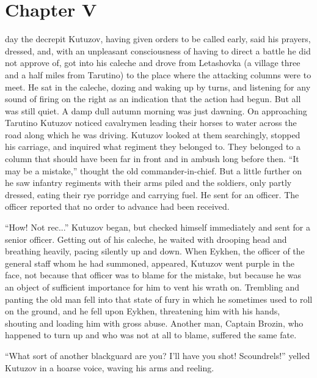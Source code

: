 \chapter*{Chapter V} \ifaudio {}
\fi

 day the decrepit Kutuzov, having given orders to be called
early, said his prayers, dressed, and, with an unpleasant
consciousness of having to direct a battle he did not approve of,
got into his caleche and drove from Letashovka (a village three
and a half miles from Tarutino) to the place where the attacking
columns were to meet. He sat in the caleche, dozing and waking up
by turns, and listening for any sound of firing on the right as
an indication that the action had begun.  But all was still
quiet. A damp dull autumn morning was just dawning. On
approaching Tarutino Kutuzov noticed cavalrymen leading their
horses to water across the road along which he was
driving. Kutuzov looked at them searchingly, stopped his
carriage, and inquired what regiment they belonged to. They
belonged to a column that should have been far in front and in
ambush long before then. ``It may be a mistake,'' thought the old
commander-in-chief. But a little further on he saw infantry
regiments with their arms piled and the soldiers, only partly
dressed, eating their rye porridge and carrying fuel. He sent for
an officer. The officer reported that no order to advance had
been received.

``How! Not rec...'' Kutuzov began, but checked himself
immediately and sent for a senior officer. Getting out of his
caleche, he waited with drooping head and breathing heavily,
pacing silently up and down. When Eykhen, the officer of the
general staff whom he had summoned, appeared, Kutuzov went purple
in the face, not because that officer was to blame for the
mistake, but because he was an object of sufficient importance
for him to vent his wrath on. Trembling and panting the old man
fell into that state of fury in which he sometimes used to roll
on the ground, and he fell upon Eykhen, threatening him with his
hands, shouting and loading him with gross abuse. Another man,
Captain Brozin, who happened to turn up and who was not at all to
blame, suffered the same fate.

``What sort of another blackguard are you? I'll have you shot!
Scoundrels!'' yelled Kutuzov in a hoarse voice, waving his arms
and reeling.

